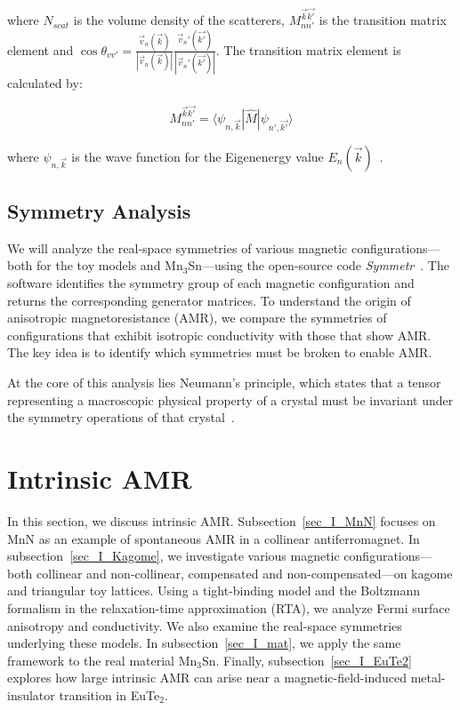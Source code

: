 \documentclass[prb,showpacs,amsmath,amssymb,superscriptaddress,twocolumn,floatfix]{revtex4-1}
\begin{document}
where $N_{scat}$ is the volume density of the scatterers, $M^{\vec{k}\vec{k'}}_{nn'}$ is the transition matrix element and $\cos \theta_{vv'} = \frac{\vec{v}_n (\vec{k})}{|\vec{v}_n (\vec{k})|}\frac{\vec{v}_n' (\vec{k'})}{|\vec{v}_n' (\vec{k'})|}$. The transition matrix element is calculated by:

\begin{equation}
	M^{\vec{k}\vec{k'}}_{nn'} = \langle \psi_{n, \vec{k}}|\hat{M}|\psi_{n', \vec{k'}} \rangle
	\label{eq_transmatrix}
\end{equation}

where $\psi_{n, \vec{k}}$ is the wave function for the Eigenenergy value $E_n(\vec{k})$~\cite{Vyborny:2009}. 


\subsection{Symmetry Analysis}
We will analyze the real-space symmetries of various magnetic configurations—both for the toy models and Mn$_3$Sn—using the open-source code \textit{Symmetr}~\cite{Symmetr}. The software identifies the symmetry group of each magnetic configuration and returns the corresponding generator matrices. To understand the origin of anisotropic magnetoresistance (AMR), we compare the symmetries of configurations that exhibit isotropic conductivity with those that show AMR. The key idea is to identify which symmetries must be broken to enable AMR.

At the core of this analysis lies Neumann’s principle, which states that a tensor representing a macroscopic physical property of a crystal must be invariant under the symmetry operations of that crystal~\cite{Ritzinger:2021}.


\section{Intrinsic AMR}
\label{sec_intrinsic}

In this section, we discuss intrinsic AMR. Subsection~\ref{sec_I_MnN} focuses on MnN as an example of spontaneous AMR in a collinear antiferromagnet. In subsection~\ref{sec_I_Kagome}, we investigate various magnetic configurations—both collinear and non-collinear, compensated and non-compensated—on kagome and triangular toy lattices. Using a tight-binding model and the Boltzmann formalism in the relaxation-time approximation (RTA), we analyze Fermi surface anisotropy and conductivity. We also examine the real-space symmetries underlying these models. In subsection~\ref{sec_I_mat}, we apply the same framework to the real material Mn$_3$Sn. Finally, subsection~\ref{sec_I_EuTe2} explores how large intrinsic AMR can arise near a magnetic-field-induced metal-insulator transition in EuTe$_2$.
\end{document}
